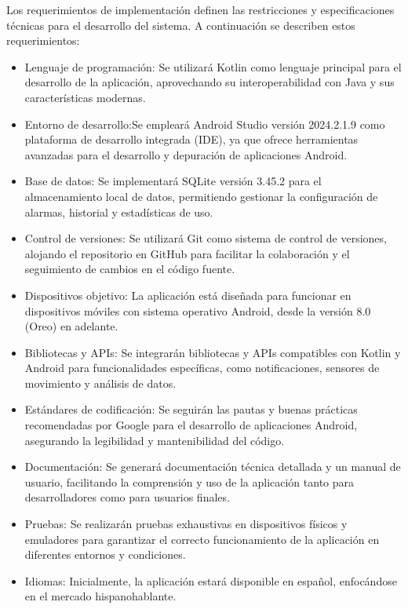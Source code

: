 Los requerimientos de implementación definen las restricciones y especificaciones técnicas para el desarrollo del sistema. A continuación se describen estos requerimientos:
\begin{itemize}
\item Lenguaje de programación: Se utilizará Kotlin como lenguaje principal para el desarrollo de la aplicación, aprovechando su interoperabilidad con Java y sus características modernas.
\item Entorno de desarrollo:Se empleará Android Studio versión 2024.2.1.9 como plataforma de desarrollo integrada (IDE), ya que ofrece herramientas avanzadas para el desarrollo y depuración de aplicaciones Android.
\item Base de datos: Se implementará SQLite versión 3.45.2 para el almacenamiento local de datos, permitiendo gestionar la configuración de alarmas, historial y estadísticas de uso.
\item Control de versiones: Se utilizará Git como sistema de control de versiones, alojando el repositorio en GitHub para facilitar la colaboración y el seguimiento de cambios en el código fuente.
\item Dispositivos objetivo: La aplicación está diseñada para funcionar en dispositivos móviles con sistema operativo Android, desde la versión 8.0 (Oreo) en adelante.
\item Bibliotecas y APIs: Se integrarán bibliotecas y APIs compatibles con Kotlin y Android para funcionalidades específicas, como notificaciones, sensores de movimiento y análisis de datos.
\item Estándares de codificación: Se seguirán las pautas y buenas prácticas recomendadas por Google para el desarrollo de aplicaciones Android, asegurando la legibilidad y mantenibilidad del código.
\item Documentación: Se generará documentación técnica detallada y un manual de usuario, facilitando la comprensión y uso de la aplicación tanto para desarrolladores como para usuarios finales.
\item Pruebas: Se realizarán pruebas exhaustivas en dispositivos físicos y emuladores para garantizar el correcto funcionamiento de la aplicación en diferentes entornos y condiciones.
\item Idiomas: Inicialmente, la aplicación estará disponible en español, enfocándose en el mercado hispanohablante.
\end{itemize}